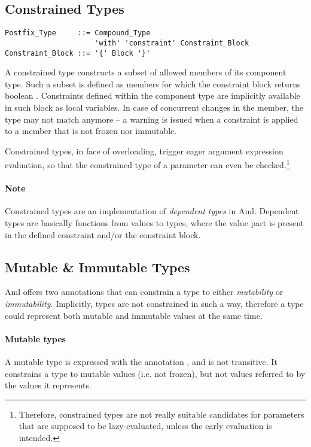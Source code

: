 \subsection{Constrained Types}
\label{sec:constrained-types}

\syntax\begin{lstlisting}
Postfix_Type     ::= Compound_Type 
                     'with' 'constraint' Constraint_Block
Constraint_Block ::= '{' Block '}'
\end{lstlisting}

A constrained type constructs a subset of allowed members of its component type. Such a subset is defined as members for which the constraint block returns boolean . Constraints defined within the component type are implicitly available in such block as local variables. In case of concurrent changes in the member, the type may not match anymore -- a warning is issued when a constraint is applied to a member that is not frozen nor immutable. 

Constrained types, in face of overloading, trigger eager argument expression evaluation, so that the constrained type of a parameter can even be checked.\footnote{Therefore, constrained types are not really suitable candidates for parameters that are supposed to be lazy-evaluated, unless the early evaluation is intended.}

\paragraph{Note}
Constrained types are an implementation of {\em dependent types} in Aml. Dependent types are basically functions from values to types, where the value part is present in the defined constraint and/or the constraint block. 





\subsection{Mutable \& Immutable Types}
\label{sec:mutable-immutable-types}

Aml offers two annotations that can constrain a type to either {\em mutability} or {\em immutability}. Implicitly, types are not constrained in such a way, therefore a type could represent both mutable and immutable values at the same time. 

\paragraph{Mutable types}
A mutable type is expressed with the annotation , and is not transitive. It constrains a type to mutable values (i.e. not frozen), but not values referred to by the values it represents. 

